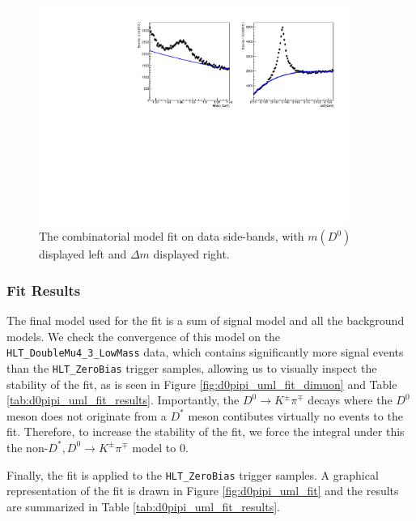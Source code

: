 \begin{figure}[htp]
    \begin{center}
      \includegraphics[width=0.9\textwidth]{figures/chapter4/normalization_fit/dpipi_fit_comb.pdf}
    \end{center}
    \caption{
      The combinatorial model fit on data side-bands, with $m(D^0)$ displayed left and $\Delta m$ displayed right.
    }
    \label{fig:d0pipi_uml_fit_comb_model}
\end{figure}

\subsubsection{Fit Results}

The final model used for the fit is a sum of signal model and all the background models. We check the convergence of this model on the \texttt{HLT\_DoubleMu4\_3\_LowMass} data, which contains significantly more signal events than the \texttt{HLT\_ZeroBias} trigger samples, allowing us to visually inspect the stability of the fit, as is seen in Figure \ref{fig:d0pipi_uml_fit_dimuon} and Table \ref{tab:d0pipi_uml_fit_results}. Importantly, the $D^0 \to K^\pm \pi^\mp$ decays where the $D^0$ meson does not originate from a $D^*$ meson contibutes virtually no events to the fit. Therefore, to increase the stability of the fit, we force the integral under this the non-$D^*,D^0 \to K^\pm \pi^\mp$ model to 0. 

Finally, the fit is applied to the \texttt{HLT\_ZeroBias} trigger samples. A graphical representation of the fit is drawn in Figure \ref{fig:d0pipi_uml_fit} and the results are summarized in Table \ref{tab:d0pipi_uml_fit_results}.


